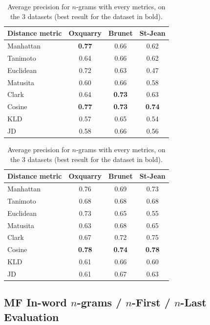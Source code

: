 \begin{table}
  \centering
  \caption{Average precision for $n$-grams with every metrics, on the 3 datasets (best result for the dataset in bold).}
  \label{tab:letter_ngrams}

  \begin{tabular}{l c c c}
    \toprule
    Distance metric & Oxquarry & Brunet & St-Jean \\
    \midrule
    Manhattan & \textbf{0.77} & 0.66 & 0.62 \\
    Tanimoto & 0.64 & 0.66 & 0.62 \\
    Euclidean & 0.72 & 0.63 & 0.47 \\
    Matusita & 0.60 & 0.66 & 0.58 \\
    Clark & 0.64 & \textbf{0.73} & 0.63 \\
    Cosine & \textbf{0.77} & \textbf{0.73} & \textbf{0.74} \\
    KLD & 0.57 & 0.65 & 0.54 \\
    JD & 0.58 & 0.66 & 0.56 \\
    \bottomrule
  \end{tabular}

  \vspace{0.5cm}

  \begin{tabular}{l c c c}
    \toprule
    Distance metric & Oxquarry & Brunet & St-Jean \\
    \midrule
    Manhattan & 0.76 & 0.69 & 0.73 \\
    Tanimoto & 0.68 & 0.68 & 0.68 \\
    Euclidean & 0.73 & 0.65 & 0.55 \\
    Matusita & 0.63 & 0.68 & 0.65 \\
    Clark & 0.67 & 0.72 & 0.75 \\
    Cosine & \textbf{0.78} & \textbf{0.74} & \textbf{0.78} \\
    KLD & 0.61 & 0.66 & 0.60 \\
    JD & 0.61 & 0.67 & 0.63 \\
    \bottomrule
  \end{tabular}
\end{table}

\subsection{MF In-word $n$-grams / $n$-First / $n$-Last Evaluation}


